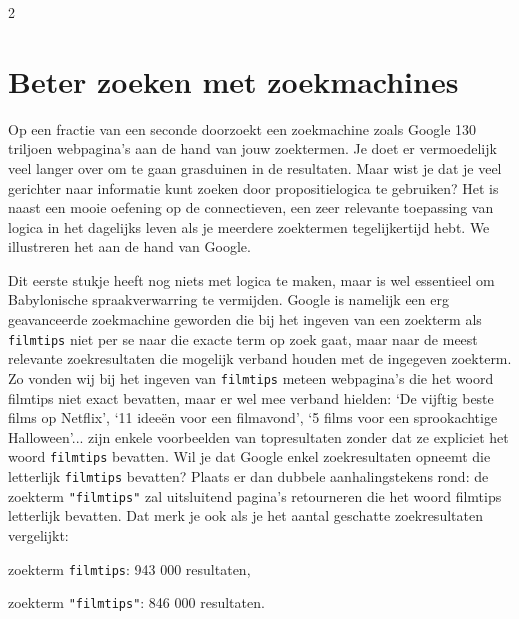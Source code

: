 \begin{multicols}{2}

\section{Beter zoeken met zoekmachines}
Op een fractie van een seconde doorzoekt een zoekmachine zoals Google 130 triljoen webpagina's aan de hand van jouw zoektermen. Je doet er vermoedelijk veel langer over om te gaan grasduinen in de resultaten. Maar wist je dat je veel gerichter naar informatie kunt zoeken door propositielogica te gebruiken? Het is naast een mooie oefening op de connectieven, een zeer relevante toepassing van logica in het dagelijks leven als je meerdere zoektermen tegelijkertijd hebt. We illustreren het aan de hand van Google.

Dit eerste stukje heeft nog niets met logica te maken, maar is wel essentieel om Babylonische spraakverwarring te vermijden. Google is namelijk een erg geavanceerde zoekmachine geworden die bij het ingeven van een zoekterm als \verb|filmtips| niet per se naar die exacte term op zoek gaat, maar naar de meest relevante zoekresultaten die mogelijk verband houden met de ingegeven zoekterm. Zo vonden wij bij het ingeven van \verb|filmtips| meteen webpagina's die het woord filmtips niet exact bevatten, maar er wel mee verband hielden: `De vijftig beste films op Netflix', `11 ideeën voor een filmavond', `5 films voor een sprookachtige Halloween'... zijn enkele voorbeelden van topresultaten zonder dat ze expliciet het woord \verb|filmtips| bevatten. Wil je dat Google enkel zoekresultaten opneemt die letterlijk \verb|filmtips| bevatten? Plaats er dan dubbele aanhalingstekens rond: de zoekterm \verb|"filmtips"| zal uitsluitend pagina's retourneren die het woord filmtips letterlijk bevatten. Dat merk je ook als je het aantal geschatte zoekresultaten vergelijkt:

\begin{opsomming}
	\item zoekterm \verb|filmtips|: 943 000 resultaten,
	\item zoekterm \verb|"filmtips"|: 846 000 resultaten.
\end{opsomming}


\end{multicols}
